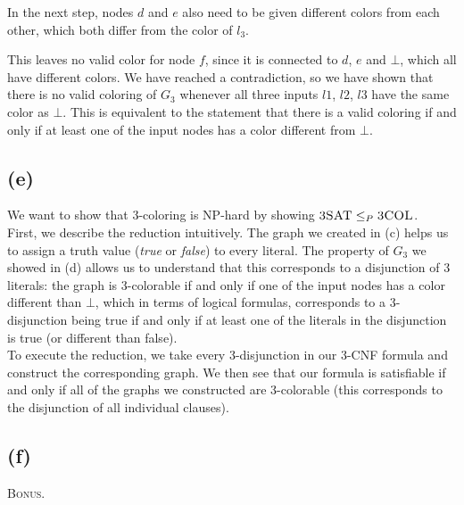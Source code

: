 In the next step, nodes $d$ and $e$ also need to be given different colors from each other, which both differ from the color of $l_{3}$.


This leaves no valid color for node $f$, since it is connected to $d$, $e$ and $\bot$, which all have different colors. We have reached a contradiction, so we have shown that there is no valid coloring of $G_{3}$ whenever all three inputs $l{1}$, $l{2}$, $l{3}$ have the same color as $\bot$. This is equivalent to the statement that there is a valid coloring if and only if at least one of the input nodes has a color different from $\bot$.

\subsection{(e)}

We want to show that 3-coloring is NP-hard by showing $\textsc{3SAT}\leq_{P}\textsc{3COL}$.\\
First, we describe the reduction intuitively. The graph we created in (c) helps us to assign a truth value (\textit{true} or \textit{false}) to every literal. The property of $G_{3}$ we showed in (d) allows us to understand that this corresponds to a disjunction of 3 literals: the graph is 3-colorable if and only if one of the input nodes has a color different than $\bot$, which in terms of logical formulas, corresponds to a 3-disjunction being true if and only if at least one of the literals in the disjunction is true (or different than false).\\
To execute the reduction, we take every 3-disjunction in our 3-CNF formula and construct the corresponding graph. We then see that our formula is satisfiable if and only if all of the graphs we constructed are 3-colorable (this corresponds to the disjunction of all individual clauses).

\subsection{(f)}

\textsc{Bonus.}


